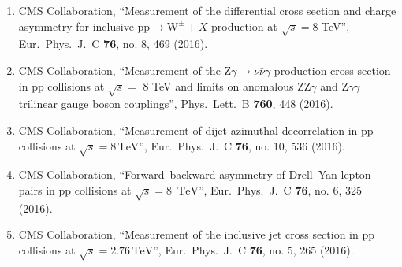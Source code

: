 \begin{enumerate}
\item CMS Collaboration, ``Measurement of the differential cross section and charge asymmetry for inclusive $\mathrm {p}\mathrm {p}\rightarrow \mathrm {W}^{\pm }+X$ production at ${\sqrt{s}} = 8$ TeV'', Eur.\ Phys.\ J.\ C {\bf 76}, no. 8, 469 (2016).

\item CMS Collaboration, ``Measurement of the $ \mathrm{ Z } \gamma \rightarrow \nu \bar{\nu} \gamma$ production cross section in pp collisions at $\sqrt{s}=$ 8 TeV and limits on anomalous $ \mathrm{ ZZ } \gamma$ and $ \mathrm{Z} \gamma \gamma$ trilinear gauge boson couplings'', Phys.\ Lett.\ B {\bf 760}, 448 (2016).

\item CMS Collaboration, ``Measurement of dijet azimuthal decorrelation in pp collisions at $\sqrt{s}=8\,\mathrm{TeV} $'', Eur.\ Phys.\ J.\ C {\bf 76}, no. 10, 536 (2016).

\item CMS Collaboration, ``Forward–backward asymmetry of Drell–Yan lepton pairs in pp collisions at $\sqrt{s} = 8$ $\,\mathrm{TeV}$'', Eur.\ Phys.\ J.\ C {\bf 76}, no. 6, 325 (2016).

\item CMS Collaboration, ``Measurement of the inclusive jet cross section in pp collisions at $\sqrt{s} = 2.76\,\text {TeV}$'', Eur.\ Phys.\ J.\ C {\bf 76}, no. 5, 265 (2016).


\end{enumerate}
